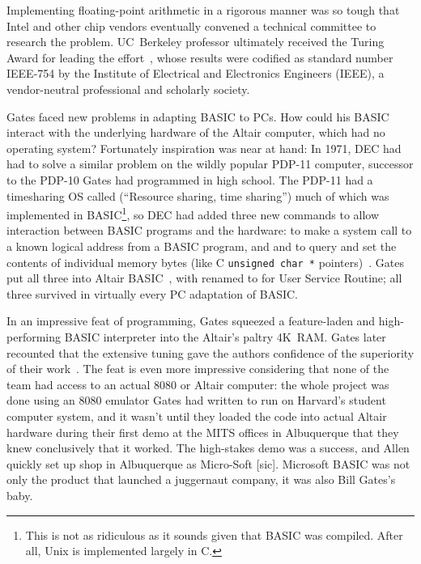  \begin{tangent}
  Implementing
  floating-point arithmetic in a rigorous manner was so tough that Intel 
  and other chip vendors eventually convened a technical committee to
  research the problem.
  UC~Berkeley professor 
  ultimately received the 
  Turing Award for
  leading the effort~\cite{kahan_interview}, whose results were codified as
  standard number IEEE-754 by the  Institute of Electrical and 
  Electronics Engineers (IEEE), a vendor-neutral professional and scholarly
  society. 
  \end{tangent}

Gates faced new problems in adapting BASIC to PCs.
How could his BASIC interact with the underlying hardware of 
the Altair computer, which had no operating
system?
Fortunately inspiration was near at hand:
In 1971, DEC had had to solve a similar problem 
on the wildly popular PDP-11 computer, successor to the PDP-10 Gates had
programmed in high school.
The PDP-11 had a 
timesharing OS called  (``Resource sharing, time
sharing'') much of which was implemented in BASIC\footnote{This is not as
  ridiculous as it sounds given that BASIC was compiled.  After all,
   Unix is implemented largely in C.}, so DEC had added
three new commands to allow interaction between BASIC programs and the
hardware:  to make a system call to a
known logical address from a BASIC program, and
 and  to query and set the contents of individual memory
bytes (like C \texttt{unsigned char~*}
pointers)~\cite[pp.~204--205]{ceruzzi}.
Gates put all three into Altair BASIC~\cite{smithsonian_interview},
with  renamed to  for User Service Routine; all three
survived in virtually every PC adaptation of BASIC.

In an impressive feat of programming, Gates squeezed a 
feature-laden and high-performing BASIC interpreter into the Altair's
paltry 4K~RAM.
Gates later recounted that the extensive tuning gave the authors
confidence of the superiority of their work~\cite{programmers_at_work}.
The feat is even more impressive considering that none of the team had
access to an actual 8080 or Altair computer: the whole project was done
using an 8080 emulator Gates had written to run on Harvard's student
computer system, and it wasn't until they loaded the code into actual
Altair hardware during their first demo at the MITS offices  in Albuquerque
that they knew conclusively that it worked.
The high-stakes demo was a success, and Allen quickly set up shop in
Albuquerque as Micro-Soft [sic].
Microsoft BASIC was not only the product that launched a juggernaut
company, it was also Bill Gates's baby.

